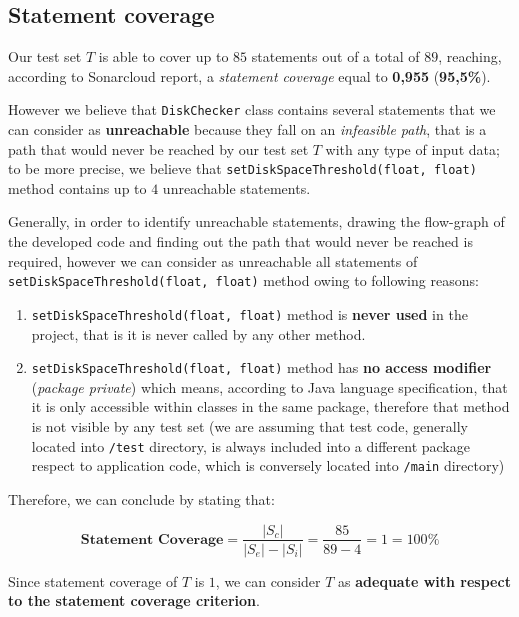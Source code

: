 \documentclass[conference]{IEEEtran}
\newcommand{\abs}[1]{\left|#1\right|}
\begin{document}
\subsection{Statement coverage}

Our test set $T$ is able to cover up to $85$ statements out of a total of $89$, reaching, according to Sonarcloud report, a \textit{statement coverage} equal to \textbf{0,955} (\textbf{95,5\%}).

However we believe that \texttt{DiskChecker} class contains several statements that we can consider as \textbf{unreachable} because they fall on an \textit{infeasible path}, that is a path that would never be reached by our test set $T$ with any type of input data; to be more precise, we believe that  \texttt{setDiskSpaceThreshold(float, float)} method contains up to $4$ unreachable statements. 

Generally, in order to identify unreachable statements, drawing the flow-graph of the developed code and finding out the path that would never be reached is required, however we can consider as unreachable all statements of \texttt{setDiskSpaceThreshold(float, float)} method owing to following reasons:

\begin{enumerate}
\item \texttt{setDiskSpaceThreshold(float, float)} method is \textbf{never used} in the project, that is it is never called by any other method.
\item \texttt{setDiskSpaceThreshold(float, float)} method has \textbf{no access modifier} (\textit{package private}) which means, according to Java language specification, that it is only accessible within classes in the same package, therefore that method is not visible by any test set (we are assuming that test code, generally located into \texttt{/test} directory, is always included into a different package respect to application code, which is conversely located into \texttt{/main} directory)
\end{enumerate}

Therefore, we can conclude by stating that:

\begin{equation} 
\textbf{Statement Coverage} = \dfrac{\abs{S_c}}{\abs{S_e} - \abs{S_i}} = \dfrac{85}{89-4} = 1 = 100\%
\end{equation}

Since statement coverage of $T$ is $1$, we can consider $T$ as \textbf{adequate with respect to the statement coverage criterion}.
\end{document}
